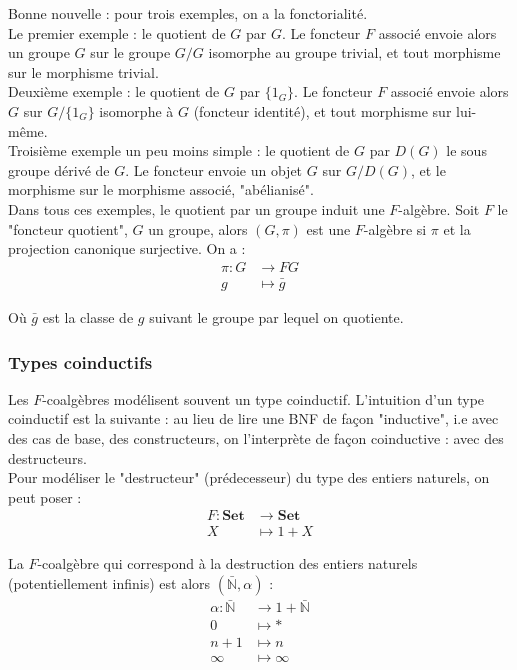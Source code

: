 \documentclass{article}
\newcommand{\N}{\mathbb{N}}
\begin{document}
Bonne nouvelle : pour trois exemples, on a la fonctorialité. \\ 
Le premier exemple : le quotient de $G$ par $G$. Le foncteur $F$ associé envoie alors un groupe $G$ sur le groupe $G/G$ isomorphe au groupe trivial, et tout morphisme sur le morphisme trivial. \\ 
Deuxième exemple : le quotient de $G$ par $\{1_G\}$. Le foncteur $F$ associé envoie alors $G$ sur $G/\{ 1_G\}$ isomorphe à $G$ (foncteur identité), et tout morphisme sur lui-même. \\ 
Troisième exemple un peu moins simple : le quotient de $G$ par $D(G)$ le sous groupe dérivé de $G$. Le foncteur envoie un objet $G$ sur $G/D(G)$, et le morphisme sur le morphisme associé, "abélianisé". \\ 
Dans tous ces exemples, le quotient par un groupe induit une $F$-algèbre. Soit $F$ le "foncteur quotient", $G$ un groupe, alors $(G, \pi)$ est une $F$-algèbre  si $\pi$ et la projection canonique surjective. On a :  
\begin{align*}
    \pi : G & \rightarrow  FG\\
          g & \mapsto \bar{g}
\end{align*}

Où $\bar{g}$ est la classe de $g$ suivant le groupe par lequel on quotiente. 

\subsubsection{Types coinductifs}
Les $F$-coalgèbres  modélisent  souvent un type coinductif. L'intuition d'un type coinductif est la suivante : au lieu de lire une BNF de façon "inductive", i.e avec des cas de base, des constructeurs, on l'interprète de façon coinductive : avec des destructeurs.  \\

Pour modéliser le "destructeur" (prédecesseur) du type des entiers naturels, on peut poser : 
\begin{align*}
    F : \mathbf{Set} & \rightarrow \mathbf{Set} \\ 
        X & \mapsto 1 + X
\end{align*}

La $F$-coalgèbre qui correspond à la destruction des entiers naturels (potentiellement infinis) est alors $(\bar{\N}, \alpha)$ : 
\begin{align*}
    \alpha : \bar{\N} &\rightarrow 1 + \bar{\N} \\ 
            0 &\mapsto * \\ 
            n+1 & \mapsto n \\
            \infty & \mapsto \infty
\end{align*}
\end{document}
